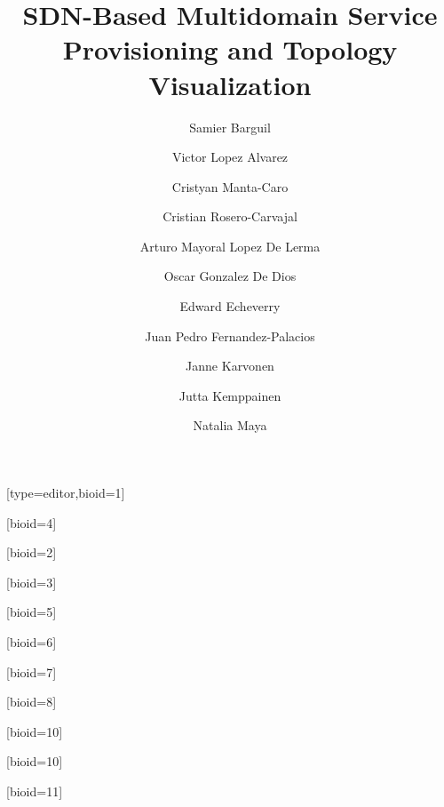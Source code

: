 \documentclass[a4paper,fleqn]{cas-dc}
\begin{document}
\let\WriteBookmarks\relax
\def\floatpagepagefraction{1}
\def\textpagefraction{.001}

\title [mode = title]{SDN-Based Multidomain Service Provisioning and Topology Visualization}                      



\author[1,4]{Samier Barguil}[type=editor,bioid=1]
\cormark[1]

\author[2]{Victor Lopez Alvarez}[bioid=4]

\author[4]{Cristyan Manta-Caro}[bioid=2]

\author[4]{Cristian Rosero-Carvajal}[bioid=3]

\author[2]{Arturo Mayoral Lopez De Lerma}[bioid=5]

\author[2]{Oscar Gonzalez De Dios}[bioid=6]

\author[3]{Edward Echeverry}[bioid=7]

\author[2]{Juan Pedro Fernandez-Palacios}[bioid=8]

\author[5]{Janne Karvonen}[bioid=10]

\author[5]{Jutta Kemppainen}[bioid=10]

\author[5]{Natalia Maya}[bioid=11]

\address[1]{Universidad Autonoma de Madrid, Madrid, Spain}
\address[2]{Telefonica I+D, Ronda de la Comunicacion, Madrid, Spain}
\address[3]{Telefonica Movistar, Transversal 60 No 114ª -55. Bogotá, Colombia}
\address[4]{Wipro Technologies Ltd., Doddakannelli, Sarjapur Road
Bengaluru - 560 035, India}
\address[5]{Infinera Corporation, 140 Caspian Court, Sunnyvale, CA 94089, USA}

\end{document}
